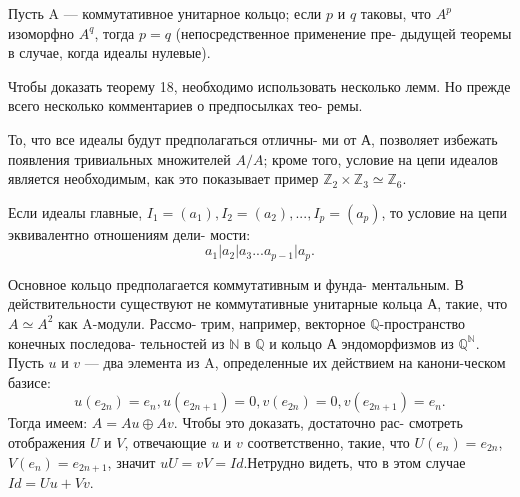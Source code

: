 \begin{sled}
Пусть A — коммутативное унитарное кольцо; если $p$ и $q$ таковы, \linebreak что $A^p$ изоморфно $A^q$, тогда $p = q$ (непосредственное применение пре- \linebreak дыдущей теоремы в случае, когда идеалы нулевые). 

Чтобы доказать теорему 18, необходимо использовать несколько \linebreak лемм. Но прежде всего несколько комментариев о предпосылках тео- \linebreak ремы.
\end{sled}
\begin{mynotice} То, что все идеалы будут предполагаться отличны- \linebreak ми от А, позволяет избежать появления тривиальных множителей \linebreak $A/A$; кроме того, условие на цепи идеалов является необходимым, \linebreak как это показывает пример $\mathbb{Z}_2 \times \mathbb{Z}_3 \simeq \mathbb{Z}_6$. 

Если идеалы главные, $I_1 = (a_1), I_2 = (a_2), ...,$\linebreak $I_p = (a_p)$, то условие на цепи эквивалентно отношениям дели- \linebreak мости:
$$a_1 | a_2 | a_3 ... a_{p-1} | a_p.$$ 

Основное кольцо предполагается коммутативным и фунда- \linebreak ментальным. В действительности существуют не коммутативные \linebreak унитарные кольца А, такие, что $A \simeq A^2$ как A-модули. Рассмо- \linebreak трим, например, векторное $\mathbb{Q}$-пространство конечных последова- \linebreak тельностей из $\mathbb{N}$ в $\mathbb{Q}$ и кольцо А эндоморфизмов из $\mathbb{Q}^{\mathbb{N}}$. Пусть $u$ \linebreak и $v$ — два элемента из A, определенные их действием на канони-\linebreak ческом базисе: 
$$u(e_{2n}) = e_n, u(e_{2n+1}) = 0, v(e_{2n}) = 0, v(e_{2n+1}) = e_n.$$
Тогда имеем: $A = Au \oplus Av$. Чтобы это доказать, достаточно рас- \linebreak смотреть отображения $U$ и $V$, отвечающие $u$ и $v$ соответственно, \linebreak такие, что $U(e_n) = e_{2n}$, $V(e_n) = e_{2n + 1}$, значит $uU = vV = Id$.\linebreak Нетрудно видеть, что в этом случае $Id = Uu + Vv$.
\end{mynotice}
